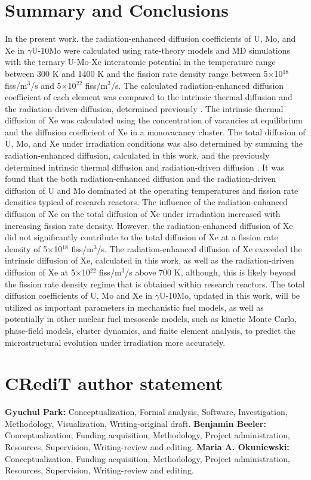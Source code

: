 \documentclass[preprint,12pt]{elsarticle}
\begin{document}
\section{Summary and Conclusions}
In the present work, the radiation-enhanced diffusion coefficients of U, Mo, and Xe in $\gamma$U-10Mo were calculated using rate-theory models and MD simulations with the ternary U-Mo-Xe interatomic potential \cite{smirnova2013ternary} in the temperature range between 300 K and 1400 K and the fission rate density range between 5$\times$10$^{18}$ fiss/m$^{3}$/s and 5$\times$10$^{22}$ fiss/m$^{3}$/s. The calculated radiation-enhanced diffusion coefficient of each element was compared to the intrinsic thermal diffusion and the radiation-driven diffusion, determined previously  \cite{beeler2021radiation, huang2013}. The intrinsic thermal diffusion of Xe was calculated using the concentration of vacancies at equilibrium and the diffusion coefficient of Xe in a monovacancy cluster. The total diffusion of U, Mo, and Xe under irradiation conditions was also determined by summing the radiation-enhanced diffusion, calculated in this work, and the previously determined intrinsic thermal diffusion and radiation-driven diffusion \cite{beeler2021radiation, huang2013}. It was found that the both radiation-enhanced diffusion and the radiation-driven diffusion of U and Mo dominated at the operating temperatures and fission rate densities typical of research reactors. The influence of the radiation-enhanced diffusion of Xe on the total diffusion of Xe under irradiation increased with increasing fission rate density. However, the radiation-enhanced diffusion of Xe did not significantly contribute to the total diffusion of Xe at a fission rate density of 5$\times$10$^{18}$ fiss/m$^{3}$/s. The radiation-enhanced diffusion of Xe exceeded the intrinsic diffusion of Xe, calculated in this work, as well as the radiation-driven diffusion of Xe at 5$\times$10$^{22}$ fiss/m$^{3}$/s above 700 K, although, this is likely beyond the fission rate density regime that is obtained within research reactors. The total diffusion coefficients of U, Mo and Xe in $\gamma$U-10Mo, updated in this work, will be utilized as important parameters in mechanistic fuel models, as well as potentially in other nuclear fuel  mesoscale models, such as kinetic Monte Carlo, phase-field models, cluster dynamics, and finite element analysis, to predict the microstructural evolution under irradiation more accurately. 

\section{CRediT author statement}
\textbf{Gyuchul Park:} Conceptualization, Formal analysis, Software, Investigation, Methodology, Visualization, Writing-original draft. \textbf{Benjamin Beeler:} Conceptualization, Funding acquisition, Methodology,  Project administration, Resources, Supervision, Writing-review and editing. \textbf{Maria A. Okuniewski:} Conceptualization, Funding acquisition, Methodology, Project administration, Resources, Supervision, Writing-review and editing.
\end{document}
